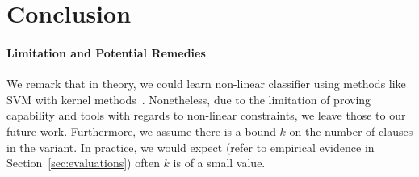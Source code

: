 
\section{Conclusion} \label{conclusion}


\paragraph{Limitation and Potential Remedies}
We remark that in theory, we could learn non-linear classifier using methods like SVM with kernel methods~\cite{yu2009evolving}. 
Nonetheless, due to the limitation of proving capability and tools with regards to non-linear constraints, we leave those to our future work. 
Furthermore, we assume there is a bound $k$ on the number of clauses in the variant. 
In practice, we would expect (refer to empirical evidence in Section~\ref{sec:evaluations}) often $k$ is of a small value.
